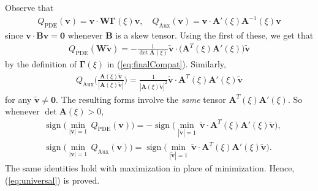 \documentclass[aps,11pt,tightenlines,notitlepage,superscriptaddress,longbibliography,nofootinbib]{revtex4-1}
\DeclareMathOperator{\sign}{sign}
\begin{document}
Observe that 
\begin{equation}
    \begin{aligned}
    Q_{\text{PDE}}(\mathbf{v}) = \mathbf{v} \cdot \mathbf{W} \boldsymbol{\Gamma}(\xi) \mathbf{v}, \quad Q_{\text{Aux}}(\mathbf{v}) = \mathbf{v} \cdot \mathbf{A}'(\xi) \mathbf{A}^{-1}(\xi) \mathbf{v}
    \end{aligned}
\end{equation}
since $\mathbf{v} \cdot \mathbf{B} \mathbf{v} = \mathbf{0}$ whenever $\mathbf{B}$ is a skew tensor. Using the first of these, we get that 
\begin{equation}
    \begin{aligned}
    Q_{\text{PDE}}(\mathbf{W}\tilde{\mathbf{v}}) = -\frac{1}{\det \mathbf{A}(\xi)}\tilde{\mathbf{v}}  \cdot \Big( \mathbf{A}^T(\xi) \mathbf{A}'(\xi) \Big) \tilde{\mathbf{v}}
    \end{aligned}
\end{equation}
by the definition of $\boldsymbol{\Gamma}(\xi)$ in (\ref{eq:finalCompat}). Similarly,  \begin{equation}
    \begin{aligned}\label{eq:QAuxFinal}
    Q_{\text{Aux}}\big( \tfrac{\mathbf{A}(\xi) \tilde{\mathbf{v}}}{|\mathbf{A}(\xi) \tilde{\mathbf{v}}|}\big) = \frac{1}{|\mathbf{A}(\xi)\tilde{\mathbf{v}}|^2} \tilde{\mathbf{v}} \cdot \mathbf{A}^T(\xi) \mathbf{A}'(\xi) \tilde{\mathbf{v}} 
    \end{aligned}
\end{equation}
for any $\tilde{\mathbf{v}} \neq \mathbf{0}$. The resulting forms involve the \textit{same} tensor $\mathbf{A}^T(\xi) \mathbf{A}'(\xi)$. So whenever $\det \mathbf{A}(\xi)> 0$, 
\begin{equation}
    \begin{aligned}
    &\sign\Big( \min_{|\mathbf{v}|=1}\, Q_{\text{PDE}}(\mathbf{v})\Big) = -\sign \Big(\min_{|\tilde{\mathbf{v}}|=1}\, \tilde{\mathbf{v}}\cdot \mathbf{A}^T (\xi) \mathbf{A}'(\xi) \tilde{\mathbf{v}} \Big), \\
    &\sign\Big( \min_{|\mathbf{v}|=1}\, Q_{\text{Aux}}(\mathbf{v})\Big) = \sign \Big(\min_{|\tilde{\mathbf{v}}|=1}\, \tilde{\mathbf{v}}\cdot \mathbf{A}^T (\xi) \mathbf{A}'(\xi) \tilde{\mathbf{v}} \Big).
    \end{aligned}
\end{equation}
The same identities hold with maximization in place of minimization. Hence, (\ref{eq:universal}) is proved.
\end{document}

